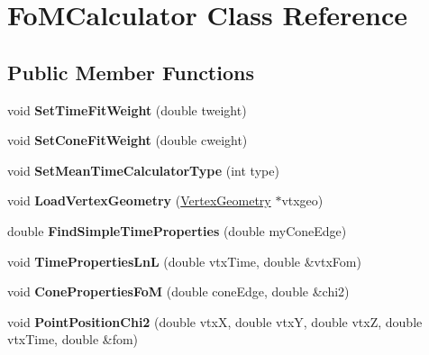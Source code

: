 \hypertarget{classFoMCalculator}{\section{Fo\-M\-Calculator Class Reference}
\label{classFoMCalculator}
}
\subsection*{Public Member Functions}
\begin{DoxyCompactItemize}
\item 
\hypertarget{classFoMCalculator_a08e7a4cf1cbdeca75bde8d3c783eb543}{void {\bfseries Set\-Time\-Fit\-Weight} (double tweight)}\label{classFoMCalculator_a08e7a4cf1cbdeca75bde8d3c783eb543}

\item 
\hypertarget{classFoMCalculator_a7b70fa75561ef8047f4851e3572bea88}{void {\bfseries Set\-Cone\-Fit\-Weight} (double cweight)}\label{classFoMCalculator_a7b70fa75561ef8047f4851e3572bea88}

\item 
\hypertarget{classFoMCalculator_a410023f27226ff81d1c1f0c6d20d8121}{void {\bfseries Set\-Mean\-Time\-Calculator\-Type} (int type)}\label{classFoMCalculator_a410023f27226ff81d1c1f0c6d20d8121}

\item 
\hypertarget{classFoMCalculator_aa6a0ef5f03186fc3722f785104199abd}{void {\bfseries Load\-Vertex\-Geometry} (\hyperlink{classVertexGeometry}{Vertex\-Geometry} $\ast$vtxgeo)}\label{classFoMCalculator_aa6a0ef5f03186fc3722f785104199abd}

\item 
\hypertarget{classFoMCalculator_afc907bb278a95071410be7d0337253a1}{double {\bfseries Find\-Simple\-Time\-Properties} (double my\-Cone\-Edge)}\label{classFoMCalculator_afc907bb278a95071410be7d0337253a1}

\item 
\hypertarget{classFoMCalculator_ad62643573ab780bf3329d0c48f615c7a}{void {\bfseries Time\-Properties\-Ln\-L} (double vtx\-Time, double \&vtx\-Fom)}\label{classFoMCalculator_ad62643573ab780bf3329d0c48f615c7a}

\item 
\hypertarget{classFoMCalculator_a8697cdce3d92b4c8afb843b4e20ae0cd}{void {\bfseries Cone\-Properties\-Fo\-M} (double cone\-Edge, double \&chi2)}\label{classFoMCalculator_a8697cdce3d92b4c8afb843b4e20ae0cd}

\item 
\hypertarget{classFoMCalculator_a14d1020216db6fc5149b7918e8138b0b}{void {\bfseries Point\-Position\-Chi2} (double vtx\-X, double vtx\-Y, double vtx\-Z, double vtx\-Time, double \&fom)}\label{classFoMCalculator_a14d1020216db6fc5149b7918e8138b0b}


\end{DoxyCompactItemize}
